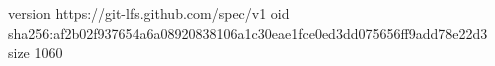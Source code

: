 version https://git-lfs.github.com/spec/v1
oid sha256:af2b02f937654a6a08920838106a1c30eae1fce0ed3dd075656ff9add78e22d3
size 1060

